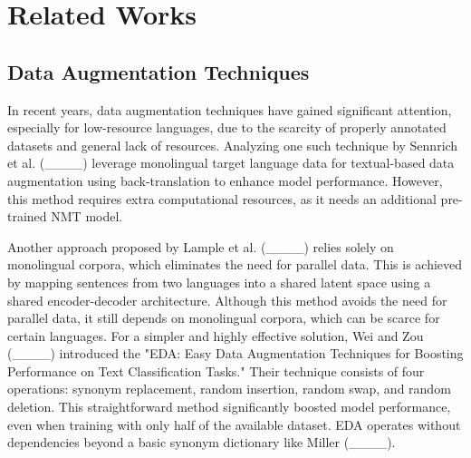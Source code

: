 \section{Related Works}
\subsection{Data Augmentation Techniques}
In recent years, data augmentation techniques have gained significant attention, especially for low-resource languages, due to the scarcity of properly annotated datasets and general lack of resources. Analyzing one such technique by Sennrich et al. (____) leverage monolingual target language data for textual-based data augmentation using back-translation to enhance model performance. However, this method requires extra computational resources, as it needs an additional pre-trained NMT model.

Another approach proposed by  Lample et al. (____) relies solely on monolingual corpora, which eliminates the need for parallel data. This is achieved by mapping sentences from two languages into a shared latent space using a shared encoder-decoder architecture. Although this method avoids the need for parallel data, it still depends on monolingual corpora, which can be scarce for certain languages. For a simpler and highly effective solution, Wei and Zou (____) introduced the "EDA: Easy Data Augmentation Techniques for Boosting Performance on Text Classification Tasks." Their technique consists of four operations: synonym replacement, random insertion, random swap, and random deletion. This straightforward method significantly boosted model performance, even when training with only half of the available dataset. EDA operates without dependencies beyond a basic synonym dictionary like Miller (____).

